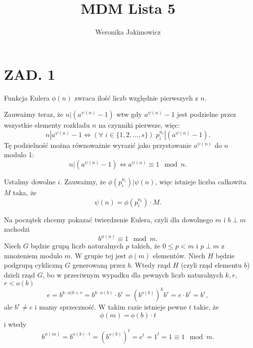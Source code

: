 \documentclass{article}[13pt]
\author{Weronika Jakimowicz}
\title{MDM Lista 5}
\date{}
\begin{document}
\maketitle

\section*{ZAD. 1}

Funkcja Eulera $\phi(n)$ zwraca ilość liczb względnie pierwszych z $n$.
\medskip



Zauważmy teraz, że $n|(a^{\psi(n)}-1)$ wtw gdy $a^{\psi(n)}-1$ jest podzielne przez wszystkie elementy rozkładu $n$ na czynniki pierwsze, więc:
$$n|a^{\psi(n)}-1\iff(\forall\;i\in\{1,2,...,s\})\;p_i^{n_i}|(a^{\psi(n)}-1).$$
Tę podzielność można równoważnie wyrazić jako przystawanie $a^{\psi(n)}$ do $n$ modulo 1:
$$n|(a^{\psi(n)}-1)\iff a^{\psi(n)}\equiv 1\mod n.$$
\bigskip

Ustalmy dowolne $i$. Zauważmy, że $\phi(p_i^{n_i})|\psi(n)$, więc istnieje liczba całkowita $M$ taka, że
$$\psi(n)=\phi(p_i^{n_i})\cdot M.$$
\bigskip

Na początek chcemy pokazać twierdzenie Eulera, czyli dla dowolnego $m$ i $b\perp m$ zachodzi
$$b^{\phi(n)}\equiv 1\mod m.$$
Niech $G$ będzie grupą liczb naturalnych $p$ takich, że $0\leq p<m$ i $p\perp m$ z mnożeniem modulo $m$. W grupie tej jest $\phi(m)$ elementów. Niech $H$ będzie podgrupą cykliczną $G$ generowaną przez $b$. Wtedy rząd $H$ (czyli rząd elementu $b$) dzieli rząd $G$, bo w przeciwnym wypadku dla pewnych liczb naturalnych $k,r$, $r<o(b)$
$$e=b^{k\cdot o(b+r}=b^{k\cdot o(b)}\cdot b^{r}=(b^{o(b)})^kb^r=e\cdot b^r=b^r,$$
ale $b^r\neq e$ i mamy sprzeczność. W takim razie istnieje pewne $t$ takie, że
$$\phi(m)=o(b)\cdot t$$
i wtedy
$$b^{\phi(m)}=b^{o(b)\cdot t}=(b^{o(b)})^t=e^t=1^t=1\equiv 1\mod m.$$
\bigskip
\end{document}
